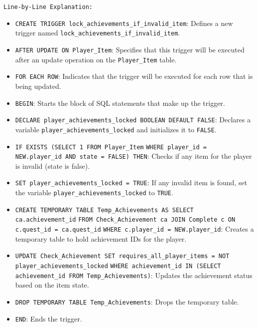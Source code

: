 \documentclass{article}
\begin{document}
\texttt{Line-by-Line Explanation:}
\begin{itemize}
    \item \lstinline|CREATE TRIGGER lock_achievements_if_invalid_item|: Defines a new trigger named \linebreak \lstinline|lock_achievements_if_invalid_item|.
    \item \lstinline|AFTER UPDATE ON Player_Item|: Specifies that this trigger will be executed after \linebreak an update operation on the \lstinline|Player_Item| table.
    \item \lstinline|FOR EACH ROW|: Indicates that the trigger will be executed for each row that is being updated.
    \item \lstinline|BEGIN|: Starts the block of SQL statements that make up the trigger.
    \item \lstinline|DECLARE player_achievements_locked BOOLEAN DEFAULT FALSE|: Declares a variable \linebreak \lstinline|player_achievements_locked| and initializes it to \lstinline|FALSE|.
    \item \lstinline|IF EXISTS (SELECT 1 FROM Player_Item| \linebreak \lstinline|WHERE player_id = NEW.player_id AND state = FALSE) THEN|: Checks if any item for the player is invalid (state is false).
    \item \lstinline|SET player_achievements_locked = TRUE|: If any invalid item is found, set the variable \linebreak \lstinline|player_achievements_locked| to \lstinline|TRUE|.
    \item \lstinline|CREATE TEMPORARY TABLE Temp_Achievements AS SELECT ca.achievement_id| \linebreak \lstinline|FROM Check_Achievement ca JOIN Complete c ON c.quest_id = ca.quest_id| \linebreak \lstinline|WHERE c.player_id = NEW.player_id|: Creates a temporary table to hold achievement IDs for the player.
    \item \lstinline|UPDATE Check_Achievement SET requires_all_player_items = NOT player_achievements_locked| \linebreak \lstinline|WHERE achievement_id IN (SELECT achievement_id FROM Temp_Achievements)|: \linebreak Updates the achievement status based on the item state.
    \item \lstinline|DROP TEMPORARY TABLE Temp_Achievements|: Drops the temporary table.
    \item \lstinline|END|: Ends the trigger.
\end{itemize}
\end{document}
